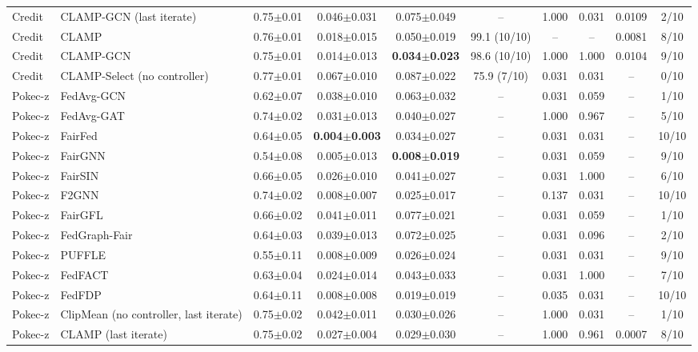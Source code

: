 \begin{table}[tbp]
{\begin{tabular}{llcccccccc}
Credit & CLAMP-GCN (last iterate) & 0.75$\pm$0.01 & 0.046$\pm$0.031 & 0.075$\pm$0.049 & -- & 1.000 & 0.031 & 0.0109 & 2/10 \\
Credit & CLAMP & 0.76$\pm$0.01 & 0.018$\pm$0.015 & 0.050$\pm$0.019 & 99.1 (10/10) & -- & -- & 0.0081 & 8/10 \\
Credit & CLAMP-GCN & 0.75$\pm$0.01 & 0.014$\pm$0.013 & \textbf{0.034$\pm$0.023} & 98.6 (10/10) & 1.000 & 1.000 & 0.0104 & 9/10 \\
Credit & CLAMP-Select (no controller) & 0.77$\pm$0.01 & 0.067$\pm$0.010 & 0.087$\pm$0.022 & 75.9 (7/10) & 0.031 & 0.031 & -- & 0/10 \\
Pokec-z & FedAvg-GCN & 0.62$\pm$0.07 & 0.038$\pm$0.010 & 0.063$\pm$0.032 & -- & 0.031 & 0.059 & -- & 1/10 \\
Pokec-z & FedAvg-GAT & 0.74$\pm$0.02 & 0.031$\pm$0.013 & 0.040$\pm$0.027 & -- & 1.000 & 0.967 & -- & 5/10 \\
Pokec-z & FairFed & 0.64$\pm$0.05 & \textbf{0.004$\pm$0.003} & 0.034$\pm$0.027 & -- & 0.031 & 0.031 & -- & 10/10 \\
Pokec-z & FairGNN & 0.54$\pm$0.08 & 0.005$\pm$0.013 & \textbf{0.008$\pm$0.019} & -- & 0.031 & 0.059 & -- & 9/10 \\
Pokec-z & FairSIN & 0.66$\pm$0.05 & 0.026$\pm$0.010 & 0.041$\pm$0.027 & -- & 0.031 & 1.000 & -- & 6/10 \\
Pokec-z & F2GNN & 0.74$\pm$0.02 & 0.008$\pm$0.007 & 0.025$\pm$0.017 & -- & 0.137 & 0.031 & -- & 10/10 \\
Pokec-z & FairGFL & 0.66$\pm$0.02 & 0.041$\pm$0.011 & 0.077$\pm$0.021 & -- & 0.031 & 0.059 & -- & 1/10 \\
Pokec-z & FedGraph-Fair & 0.64$\pm$0.03 & 0.039$\pm$0.013 & 0.072$\pm$0.025 & -- & 0.031 & 0.096 & -- & 2/10 \\
Pokec-z & PUFFLE & 0.55$\pm$0.11 & 0.008$\pm$0.009 & 0.026$\pm$0.024 & -- & 0.031 & 0.031 & -- & 9/10 \\
Pokec-z & FedFACT & 0.63$\pm$0.04 & 0.024$\pm$0.014 & 0.043$\pm$0.033 & -- & 0.031 & 1.000 & -- & 7/10 \\
Pokec-z & FedFDP & 0.64$\pm$0.11 & 0.008$\pm$0.008 & 0.019$\pm$0.019 & -- & 0.035 & 0.031 & -- & 10/10 \\
Pokec-z & ClipMean (no controller, last iterate) & 0.75$\pm$0.02 & 0.042$\pm$0.011 & 0.030$\pm$0.026 & -- & 1.000 & 0.031 & -- & 1/10 \\
Pokec-z & CLAMP (last iterate) & 0.75$\pm$0.02 & 0.027$\pm$0.004 & 0.029$\pm$0.030 & -- & 1.000 & 0.961 & 0.0007 & 8/10 \\

\end{tabular}}
\end{table}
